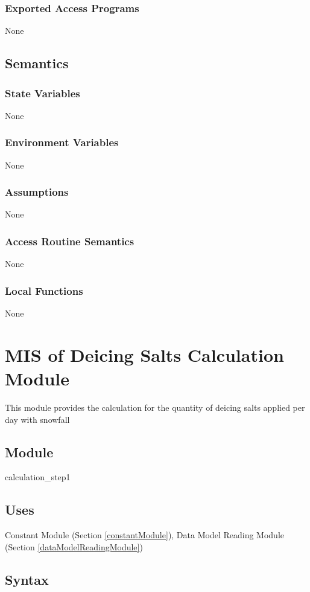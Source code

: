 \documentclass[12pt, titlepage]{article}
\begin{document}
\subsubsection{Exported Access Programs}
None

\subsection{Semantics}
\subsubsection{State Variables}
None
\subsubsection{Environment Variables}
None
\subsubsection{Assumptions}
None
\subsubsection{Access Routine Semantics}
None

\subsubsection{Local Functions}
None
\newpage

\section{MIS of Deicing Salts Calculation Module} \label{deicingSaltsCalculationModule}
This module provides the calculation for the quantity of deicing salts applied per day with snowfall

\subsection{Module}
calculation\_step1

\subsection{Uses}

Constant Module (Section \ref{constantModule}), Data Model Reading Module (Section \ref{dataModelReadingModule})


\subsection{Syntax}
\end{document}
